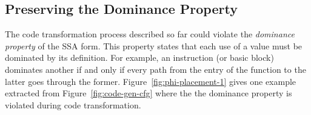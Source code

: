 \subsection{Preserving the Dominance Property} \label{sec:ssa-fix}
%
The code transformation process described so far could violate the \textit{dominance property} of the SSA form. This property states that
each use of a value must be dominated by its definition. For example, an instruction (or basic block) dominates another if and only if
every path from the entry of the function to the latter goes through the former. Figure~\ref{fig:phi-placement-1} gives one example
extracted from Figure~\ref{fig:code-gen-cfg} where the the dominance property is violated during code transformation.

